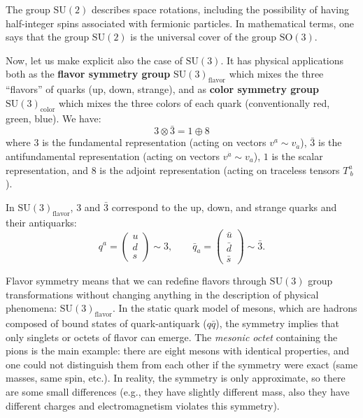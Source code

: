 \begin{example}
    The group \(\mathrm{SU}(2)\) describes space rotations, including the possibility of having half-integer spins associated with fermionic particles. In mathematical terms, one says that the group \(\mathrm{SU}(2)\) is the universal cover of the group \(\mathrm{SO}(3)\).
\end{example}

\begin{example}
    Now, let us make explicit also the case of \(\mathrm{SU}(3)\). It has physical applications both as the \textbf{flavor symmetry group} \(\mathrm{SU}(3)_{\text{flavor}}\) which mixes the three ``flavors'' of quarks (up, down, strange), and as \textbf{color symmetry group} \(\mathrm{SU}(3)_{\text{color}}\) which mixes the three colors of each quark (conventionally red, green, blue). We have:
    \begin{equation}
        3 \otimes \bar{3} = 1 \oplus 8
        \label{eq:SU3_tensor_decomposition}
    \end{equation}
    where \(3\) is the fundamental representation (acting on vectors \(v^a \sim v_{\dot{a}}\)), \(\bar{3}\) is the antifundamental representation (acting on vectors \(v^{\dot{a}} \sim v_a\)), \(1\) is the scalar representation, and \(8\) is the adjoint representation (acting on traceless tensors \(T^a_{\ b}\)).

    In \(\mathrm{SU}(3)_{\text{flavor}}\), 3 and \(\bar{3}\) correspond to the up, down, and strange quarks and their antiquarks:
    \[
        q^a = \begin{pmatrix} u \\ d \\ s \end{pmatrix} \sim 3, \qquad \bar{q}_a = \begin{pmatrix} \bar{u} \\ \bar{d} \\ \bar{s} \end{pmatrix} \sim \bar{3}.
    \]

    Flavor symmetry means that we can redefine flavors through \(\mathrm{SU}(3)\) group transformations without changing anything in the description of physical phenomena: \(\mathrm{SU}(3)_{\text{flavor}}\). In the static quark model of mesons, which are hadrons composed of bound states of quark-antiquark (\(q\bar{q}\)), the symmetry implies that only singlets or octets of flavor can emerge. The \textit{mesonic octet} containing the pions is the main example: there are eight mesons with identical properties, and one could not distinguish them from each other if the symmetry were exact (same masses, same spin, etc.). In reality, the symmetry is only approximate, so there are some small differences (e.g., they have slightly different mass, also they have different charges and electromagnetism violates this symmetry).


\end{example}
